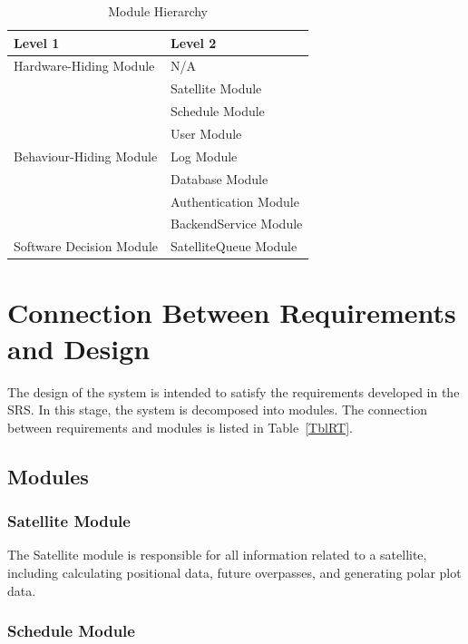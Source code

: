 \documentclass[12pt, titlepage]{article}
\begin{document}
\begin{table}[h!]
\centering
\begin{tabular}{p{} p{}}
\toprule
\textbf{Level 1} & \textbf{Level 2}\\
\midrule

{Hardware-Hiding Module} & N/A ~ \\
\midrule

\multirow{7}{0.3\textwidth}{Behaviour-Hiding Module} & Satellite Module\\
& Schedule Module\\
& User Module\\
& Log Module\\
& Database Module\\
& Authentication Module\\
& BackendService Module \\
\midrule

\multirow{1}{0.3\textwidth}{Software Decision Module} & SatelliteQueue Module \\
\midrule

\end{tabular}
\caption{Module Hierarchy}
\label{TblMH}
\end{table}

\section{Connection Between Requirements and Design} \label{SecConnection}

The design of the system is intended to satisfy the requirements developed in
the SRS. In this stage, the system is decomposed into modules. The connection
between requirements and modules is listed in Table~\ref{TblRT}.

\subsection{Modules}

\subsubsection{Satellite Module}

The Satellite module is responsible for all information related to a satellite, including calculating positional data, future overpasses, and generating polar plot data.

\subsubsection{Schedule Module}
\end{document}
